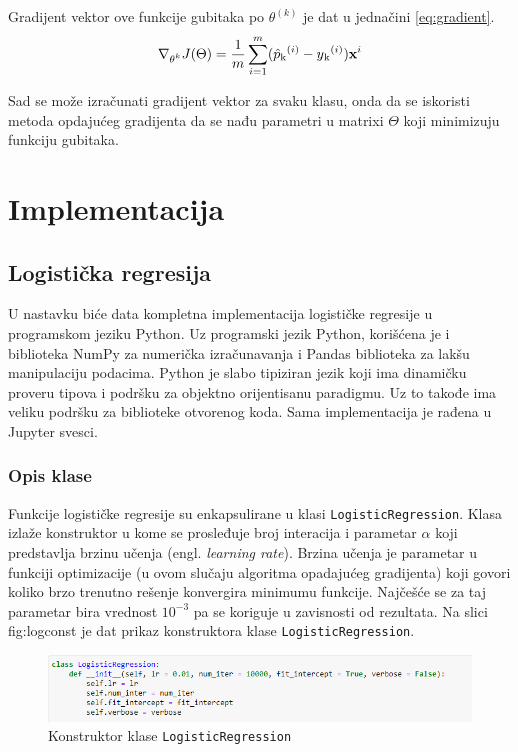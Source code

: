 \documentclass[a4paper,12pt]{report}
\begin{document}
Gradijent vektor ove funkcije gubitaka po $\theta^{(k)}$ je dat u jednačini \ref{eq:gradient}. 
\begin{equation} \label{eq:gradient}
	\nabla\textsubscript{$\theta^{k}$}   J(\Theta) = \frac{1}{m}\sum_{i = 1}^{m} (\hat{p}\textsubscript{k}^{(i)} - y\textsubscript{k}^{(i)})\textbf{x}^{i}
\end{equation}

Sad se može izračunati gradijent vektor za svaku klasu, onda da se iskoristi metoda opdajućeg gradijenta da se nađu parametri u matrixi $\Theta$ koji minimizuju funkciju gubitaka. 
\chapter{Implementacija}

\section{Logistička regresija}

U nastavku biće data kompletna implementacija logističke regresije u programskom jeziku Python. Uz programski jezik Python, korišćena je i biblioteka NumPy za numerička izračunavanja i Pandas biblioteka za lakšu manipulaciju podacima. Python je slabo tipiziran jezik koji ima dinamičku proveru tipova i podršku za objektno orijentisanu paradigmu. Uz to takođe ima veliku podršku za biblioteke otvorenog koda. Sama implementacija je rađena u Jupyter svesci.\\ 

\subsection{Opis klase}

Funkcije logističke regresije su enkapsulirane u klasi \texttt{LogisticRegression}. Klasa izlaže konstruktor u kome se prosleđuje broj interacija i parametar $\alpha$ koji predstavlja brzinu učenja (engl. \textit{learning rate}). Brzina učenja je parametar u funkciji optimizacije (u ovom slučaju algoritma opadajućeg gradijenta) koji govori koliko brzo trenutno rešenje konvergira minimumu funkcije. Najčešće se za taj parametar bira vrednost $10^{-3}$ pa se koriguje u zavisnosti od rezultata. Na slici {fig:logconst} je dat prikaz konstruktora klase \texttt{LogisticRegression}.

\begin{figure}[h]
    \centering
    \includegraphics[width=\textwidth]{logistic_constructor.png}
    \caption{Konstruktor klase \texttt{LogisticRegression}}\label{fig:logconst}
\end{figure}
\end{document}
